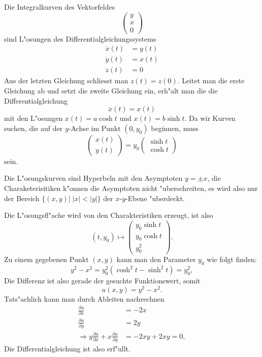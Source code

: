 \begin{loesung}
\begin{teilaufgaben}
\item
Die Integralkurven des Vektorfeldes
\[
\begin{pmatrix}
y\\x\\0
\end{pmatrix}
\]
sind L"osungen des Differentialgleichungssystems
\begin{align*}
\dot x(t)&=y(t)\\
\dot y(t)&=x(t)\\
\dot z(t)&=0
\end{align*}
Aus der letzten Gleichung schliesst man $z(t)=z(0)$. Leitet man die erste
Gleichung ab und setzt die zweite Gleichung ein, erh"alt man die
die Differentialgleichung
\[
\ddot x(t)=x(t)
\]
mit den L"osungen $x(t)=a\cosh t$ und $x(t)=b\sinh t$. Da wir Kurven
suchen, die auf der $y$-Achse im Punkt $(0,y_0)$ beginnen, muss
\[
\begin{pmatrix}
x(t)\\y(t)
\end{pmatrix}
=
y_0
\begin{pmatrix}
\sinh t\\
\cosh t
\end{pmatrix}
\]
sein.
\item
Die L"osungskurven sind Hyperbeln mit den Asymptoten $y=\pm x$, die
Charaketerisitiken k"onnen die Asymptoten nicht "uberschreiten, es wird
also nur der Bereich $\{(x,y)|\;|x|<|y|\}$ der $x$-$y$-Ebene "uberdeckt.
\item
Die L"osungsfl"ache wird von den Charakteristiken erzeugt, ist also
\[
(t,y_0)
\mapsto
\begin{pmatrix}
y_0\sinh t\\
y_0\cosh t\\
y_0^2
\end{pmatrix}.
\]
Zu einem gegebenen Punkt $(x,y)$ kann man den Parameter $y_0$ wie folgt
finden:
\[
y^2-x^2=y_0^2(\cosh^2t-\sinh^2t)=y_0^2,
\]
Die Differenz ist also gerade der gesuchte Funktionswert, somit
\[
u(x,y)=y^2-x^2.
\]
Tats"achlich kann man durch Ableiten nachrechnen
\begin{align*}
\frac{\partial u}{\partial x}&=-2x\\
\frac{\partial u}{\partial y}&=2y\\
\Rightarrow
y\frac{\partial u}{\partial x}+x\frac{\partial u}{\partial y}&=-2xy+2xy=0,
\end{align*}
Die Differentialgleichung ist also erf"ullt.

\end{teilaufgaben}
\end{loesung}
